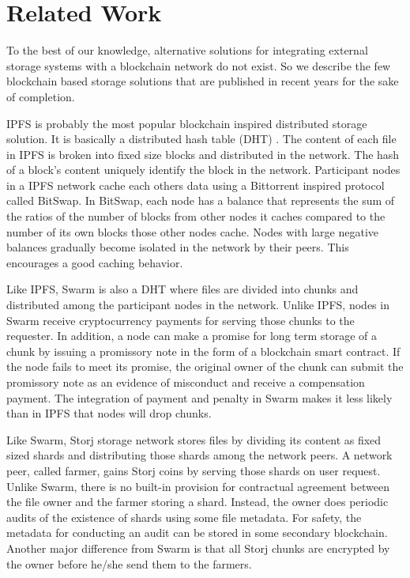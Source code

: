        
\section{Related Work}
\label{s-rw}
To the best of our knowledge, alternative solutions for integrating external storage systems with a blockchain network do not exist. So we describe the few blockchain based storage solutions that are published in recent years for the sake of completion.   

IPFS \cite{ipfs} is probably the most popular blockchain inspired distributed storage solution. It is basically a distributed hash table (DHT) \cite{Maymounkov:2002:KPI:646334.687801}. The content of each file in IPFS is broken into fixed size blocks and distributed in the network. The hash of a block's content uniquely identify the block in the network. Participant nodes in a IPFS network cache each others data using a Bittorrent \cite{Pouwelse:2005:BPF:2138958.2138984} inspired protocol called BitSwap. In BitSwap, each node has a balance that represents the sum of the ratios of the number of blocks from other nodes it caches compared to the number of its own blocks those other nodes cache. Nodes with large negative balances gradually become isolated in the network by their peers. This encourages a good caching behavior.

Like IPFS, Swarm \cite{swarm} is also a DHT where files are divided into chunks and distributed among the participant nodes in the network. Unlike IPFS, nodes in Swarm receive cryptocurrency payments for serving those chunks to the requester. In addition, a node can make a promise for long term storage of a chunk by issuing a promissory note in the form of a blockchain smart contract. If the node fails to meet its promise, the original owner of the chunk can submit the promissory note as an evidence of misconduct and receive a compensation payment. The integration of payment and penalty in Swarm makes it less likely than in IPFS that nodes will drop chunks.                      

Like Swarm, Storj \cite{Wilkinson14storja} storage network stores files by dividing its content as fixed sized shards and distributing those shards among the network peers. A network peer, called farmer, gains Storj coins by serving those shards on user request. Unlike Swarm, there is no built-in provision for contractual agreement between the file owner and the farmer storing a shard. Instead, the owner does periodic audits of the existence of shards using some file metadata. For safety, the metadata for conducting an audit can be stored in some secondary blockchain. Another major difference from Swarm is that all Storj chunks are encrypted by the owner before he/she send them to the farmers.         

